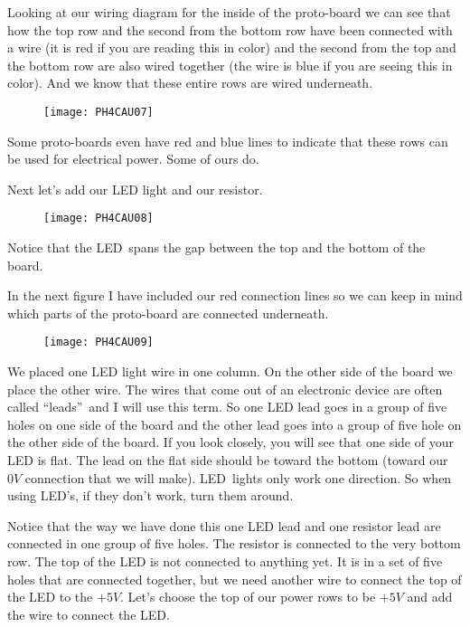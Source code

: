 Looking at our wiring diagram for the inside of the proto-board we can see
that how the top row and the second from the bottom row have been connected
with a wire (it is red if you are reading this in color) and the second from
the top and the bottom row are also wired together (the wire is blue if you
are seeing this in color). And we know that these entire rows are wired
underneath. 
\begin{figure}[h!]
	\centering
	\texttt{[image: PH4CAU07]}
\end{figure}

Some proto-boards even have red
and blue lines to indicate that these rows can be used for electrical power.
Some of ours do.

Next let's add our LED light and our resistor. 

\begin{figure}[h!]
	\centering
	\texttt{[image: PH4CAU08]}
\end{figure}

Notice that the LED\ spans the gap between the top and the bottom of the board.

In the next figure I have included our red connection lines so we can keep
in mind which parts of the proto-board are connected underneath.

\begin{figure}[h!]
		\centering
	\texttt{[image: PH4CAU09]}
\end{figure}

We placed one LED light wire in one column. On the other side of the board
we place the other wire. The wires that come out of an electronic device are
often called \textquotedblleft leads\textquotedblright\ and I will use this
term. So one LED lead goes in a group of five holes on one side of the board
and the other lead goes into a group of five hole on the other side of the
board. If you look closely, you will see that one side of your LED is flat.
The lead on the flat side should be toward the bottom (toward our $0\unit{V}$
connection that we will make). LED\ lights only work one direction. So when
using LED's, if they don't work, turn them around.

Notice that the way we have done this one LED lead and one resistor lead are
connected in one group of five holes. The resistor is connected to the very
bottom row. The top of the LED is not connected to anything yet. It is in a
set of five holes that are connected together, but we need another wire to
connect the top of the LED to the $+5\unit{V}.$ Let's choose the top of our
power rows to be $+5\unit{V}$ and add the wire to connect the LED. 

